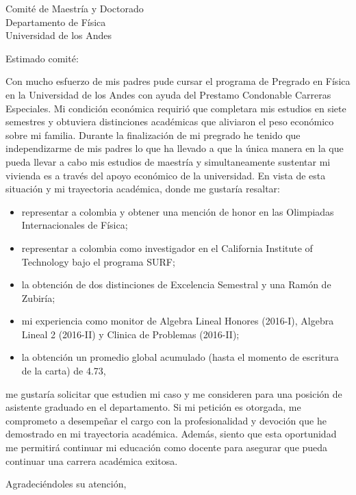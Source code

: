 \documentclass{letter}
\begin{document}
\begin{letter}{Comité de Maestría y Doctorado \\ Departamento de Física \\ Universidad de los Andes}

\opening{Estimado comité:}

Con mucho esfuerzo de mis padres pude cursar el programa de Pregrado en Física en la Universidad de los Andes con ayuda del Prestamo Condonable Carreras Especiales. Mi condición económica requirió que completara mis estudios en siete semestres y obtuviera distinciones académicas que aliviaron el peso económico sobre mi familia. Durante la finalización de mi pregrado he tenido que independizarme de mis padres lo que ha llevado a que la única manera en la que pueda llevar a cabo mis estudios de maestría y simultaneamente sustentar mi vivienda es a través del apoyo económico de la universidad. En vista de esta situación y mi trayectoria académica, donde me gustaría resaltar:

\begin{itemize}

\item representar a colombia y obtener una mención de honor en las Olimpiadas Internacionales de Física;

\item representar a colombia como investigador en el California Institute of Technology bajo el programa SURF;

\item la obtención de dos distinciones de Excelencia Semestral y una Ramón de Zubiría;

\item mi experiencia como monitor de Algebra Lineal Honores (2016-I), Algebra Lineal 2 (2016-II) y Clinica de Problemas (2016-II);

\item la obtención un promedio global acumulado (hasta el momento de escritura de la carta) de 4.73,

\end{itemize} 

me gustaría solicitar que estudien mi caso y me consideren para una posición de asistente graduado en el departamento. Si mi petición es otorgada, me comprometo a desempeñar el cargo con la profesionalidad y devoción que he demostrado en mi trayectoria académica. Además, siento que esta oportunidad me permitirá continuar mi educación como docente para asegurar que pueda continuar una carrera académica exitosa. 

\closing{Agradeciéndoles su atención,}

\end{letter}
\end{document}
